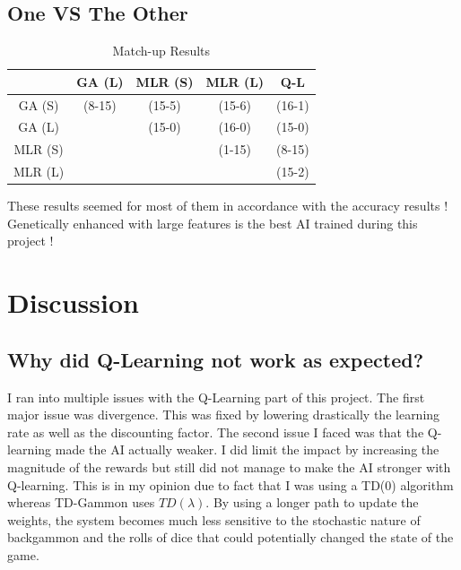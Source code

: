 \documentclass[11pt]{article}
\begin{document}
\subsection{One VS The Other}
\begin{table}[H]
\centering
\begin{tabular}{c|ccc|c|}
\cline{2-5}
                              & \multicolumn{1}{c|}{\textbf{GA (L)}} & \multicolumn{1}{c|}{\textbf{MLR (S)}} & \textbf{MLR (L)} & \textbf{Q-L} \\ \hline
\multicolumn{1}{|c|}{GA (S)}  & \multicolumn{1}{c|}{(8-15)}          & \multicolumn{1}{c|}{(15-5)}           & (15-6)           & (16-1)       \\ \hline
\multicolumn{1}{|c|}{GA (L)}  & \multicolumn{1}{c|}{}                & \multicolumn{1}{c|}{(15-0)}           & (16-0)           & (15-0)       \\ \cline{1-1} \cline{3-5} 
\multicolumn{1}{|c|}{MLR (S)} &                                      & \multicolumn{1}{c|}{}                 & (1-15)           & (8-15)       \\ \cline{1-1} \cline{4-5} 
\multicolumn{1}{|c|}{MLR (L)} &                                      &                                       &                  & (15-2)       \\ \cline{1-1} \cline{5-5} 
\end{tabular}
\caption{Match-up Results}
\end{table}

These results seemed for most of them in accordance with the accuracy results ! Genetically enhanced with large features is the best AI trained during this project !
 
\section{Discussion}

\subsection{Why did Q-Learning not work as expected?}

I ran into multiple issues with the Q-Learning part of this project. The first major issue was divergence. This was fixed by lowering drastically the learning rate as well as the discounting factor. The second issue I faced was that the Q-learning made the AI actually weaker. I did limit the impact by increasing the magnitude of the rewards but still did not manage to make the AI stronger with Q-learning. This is in my opinion due to fact that I was using a TD(0) algorithm whereas TD-Gammon uses $TD(\lambda)$. By using a longer path to update the weights, the system becomes much less sensitive to the stochastic nature of backgammon and the rolls of dice that could potentially changed the state of the game.
\end{document}
